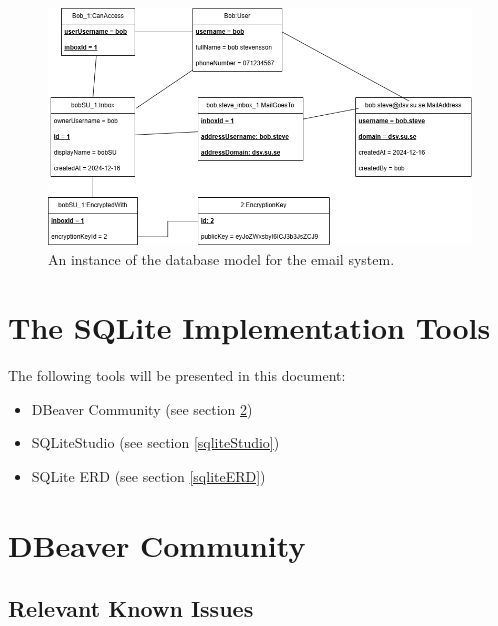 \documentclass[a4paper,10pt,oneside]{article}
\begin{document}
\begin{figure}[h]
    \centering
    \includegraphics[width=1\textwidth]{model/instance.png}
    \caption{An instance of the database model for the email system.}
    \label{fig:instanceDatabaseModel}
\end{figure}

\section{The SQLite Implementation Tools}
\label{sqliteImplementationTools}
The following tools will be presented in this document:
\begin{itemize}
    \item DBeaver Community (see section \ref{dbeaverCommunity})
    \item SQLiteStudio (see section \ref{sqliteStudio})
    \item SQLite ERD (see section \ref{sqliteERD})
\end{itemize}

\section{DBeaver Community}
\label{dbeaverCommunity}

\subsection{Relevant Known Issues}
\label{dbeaverKnownIssues}
\end{document}
